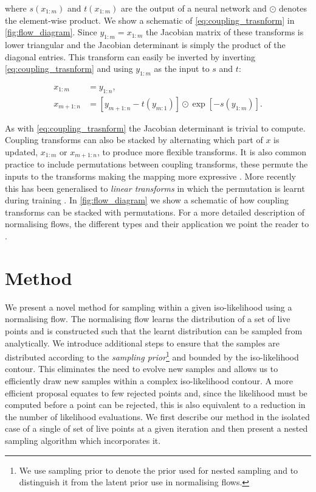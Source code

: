 \documentclass[%
 reprint,
nofootinbib,
 amsmath,amssymb,
 aps,
 prd,
]{revtex4-2}
\begin{document}
where $s(x_{1:m})$ and $t(x_{1:m})$ are the output of a neural network and $\odot$ denotes the element-wise product. We show a schematic of \cref{eq:coupling_trasnform} in \cref{fig:flow_diagram}. Since $y_{1:m} = x_{1:m}$ the Jacobian matrix of these transforms is lower triangular and  the Jacobian determinant is simply the product of the diagonal entries. This transform can easily be inverted by inverting \cref{eq:coupling_trasnform} and using $y_{1:m}$ as the input to $s$ and $t$:

\begin{subequations}\label{eq:inverse_coupling_trasnform}
    \begin{align}
        x_{1:m} & = y_{1:n}, \\
        x_{m+1:n} & = \left[y_{m+1:n} - t(y_{m:1})\right] \odot \exp \left[-s(y_{1:m})\right].  
    \end{align}
\end{subequations}

As with \cref{eq:coupling_trasnform} the Jacobian determinant is trivial to compute. Coupling transforms can also be stacked by alternating which part of $x$ is updated, $x_{1:m}$ or $x_{m+1:n}$, to produce more flexible transforms. It is also common practice to include permutations between coupling transforms, these permute the inputs to the transforms making the mapping more expressive \cite{Dinh:2016:rnvp}. More recently this has been generalised to \textit{linear transforms} in which the permutation is learnt during training \cite{Kingma:2018glow}. In \cref{fig:flow_diagram} we show a schematic of how coupling transforms can be stacked with permutations. For a more detailed description of normalising flows, the different types and their application we point the reader to \cite{Kobyzev:2019nf,Paramakarios:2019nfpmi}.


\section{Method}\label{sec:method}

We present a novel method for sampling within a given iso-likelihood using a normalising flow. The normalising flow learns the distribution of a set of live points and is constructed such that the learnt distribution can be sampled from analytically. We introduce additional steps to ensure that the samples are distributed according to the \textit{sampling prior}\footnote{We use sampling prior to denote the prior used for nested sampling and to distinguish it from the latent prior use in normalising flows.} and bounded by the iso-likelihood contour. This eliminates the need to evolve new samples and allows us to efficiently draw new samples within a complex iso-likelihood contour. A more efficient proposal equates to few rejected points and, since the likelihood must be computed before a point can be rejected, this is also equivalent to a reduction in the number of likelihood evaluations. We first describe our method in the isolated case of a single of set of live points at a given iteration and then present a nested sampling algorithm which incorporates it.
\end{document}
